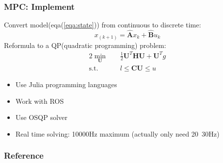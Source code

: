 \documentclass{beamer}
\begin{document}
\begin{frame}
  \frametitle{MPC: Implement}
  Convert model(eqa(\ref{eqa:state})) from continuous to discrete time:
  \begin{equation}
  x_{(k+1)} = \hat{\mathbf{A}}x_{k}+\hat{\mathbf{B}}u_{k}
  \end{equation}
  Reformula to a QP(quadratic programming) problem:
  \begin{alignat}{2}
    \min_{\mathbf{U}} \quad & \frac{1}{2}\mathbf{U}^T\mathbf{HU}+\mathbf{U}^Tg \\
    \mbox{s.t.}\quad
    &l \leq \mathbf{CU} \leq u
  \end{alignat}
  \begin{itemize}
    \item Use Julia programming languages\cite{bezanson2017julia}
    \item Work with ROS
    \item Use OSQP\cite{osqp} solver
    \item Real time solving: 10000Hz maximum (actually only need 20~30Hz)
  \end{itemize}
\end{frame}

\begin{frame}[allowframebreaks]
  \frametitle{Reference}
  \begin{small}
  
  
  \end{small}
\end{frame}
\end{document}
